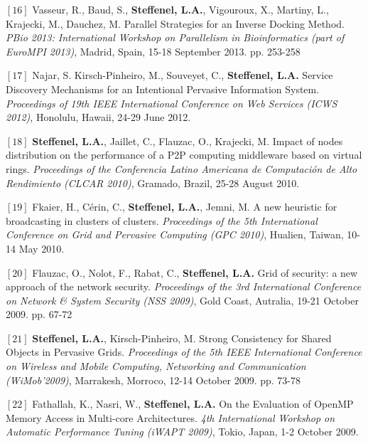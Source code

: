 \documentclass[final,twoside]{hdr} %
\begin{document}
\vspace{1em} \noindent $[16]$
Vasseur, R., Baud, S., {\bf Steffenel, L.A.}, Vigouroux, X., Martiny, L., Krajecki, M., Dauchez, M. {Parallel Strategies for an Inverse Docking Method}. {\em PBio 2013: International Workshop on Parallelism in Bioinformatics (part of EuroMPI 2013)}, Madrid, Spain, 15-18 September 2013. pp. 253-258

\vspace{1em} \noindent $[17]$
Najar, S. Kirsch-Pinheiro, M., Souveyet, C., {\bf Steffenel, L.A.} {Service Discovery Mechanisms for an Intentional Pervasive Information System}. {\em Proceedings of 19th IEEE International Conference on Web Services (ICWS 2012)}, Honolulu, Hawaii, 24-29 June 2012. 

\vspace{1em} \noindent $[18]$
{\bf Steffenel, L.A.}, Jaillet, C., Flauzac, O., Krajecki, M. {Impact of nodes distribution on the performance of a P2P computing middleware based on virtual rings}. {\em Proceedings of the Conferencia Latino Americana de Computación de Alto Rendimiento (CLCAR 2010)}, Gramado, Brazil, 25-28 August 2010.

\vspace{1em} \noindent $[19]$
Fkaier, H., Cérin, C., {\bf Steffenel, L.A.}, Jemni, M. {A new heuristic for broadcasting in clusters of clusters}. {\em Proceedings of the 5th International Conference on Grid and Pervasive Computing (GPC 2010)}, Hualien, Taiwan, 10-14 May 2010.

\vspace{1em} \noindent $[20]$
Flauzac, O., Nolot, F., Rabat, C., {\bf Steffenel, L.A.} {Grid of security: a new approach of the network security}. {\em Proceedings of the 3rd International Conference on Network \& System Security (NSS 2009)}, Gold Coast, Autralia, 19-21 October 2009. pp. 67-72

\vspace{1em} \noindent $[21]$
{\bf Steffenel, L.A.}, Kirsch-Pinheiro, M. {Strong Consistency for Shared Objects in Pervasive Grids}. {\em Proceedings of the 5th IEEE International Conference on Wireless and Mobile Computing, Networking and Communication (WiMob'2009)}, Marrakesh, Morroco, 12-14 October 2009. pp. 73-78 

\vspace{1em} \noindent $[22]$
Fathallah, K., Nasri, W., {\bf Steffenel, L.A.} {On the Evaluation of OpenMP Memory Access in Multi-core Architectures}. {\em 4th International Workshop on Automatic Performance Tuning (iWAPT 2009)}, Tokio, Japan, 1-2 October 2009. 
\end{document}
